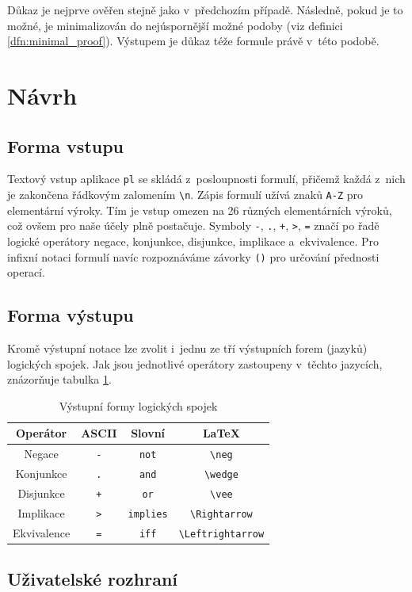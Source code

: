 \documentclass[thesis=B,czech,hidelinks]{thesis}[2012/06/26]
\begin{document}
Důkaz je nejprve ověřen stejně jako v~předchozím případě. Následně, pokud je to možné, je minimalizován do nejúspornější možné podoby (viz definici \ref{dfn:minimal_proof}). Výstupem je důkaz téže formule právě v~této podobě.

\section{Návrh}

\subsection{Forma vstupu}

Textový vstup aplikace \texttt{pl} se skládá z~posloupnosti formulí, přičemž každá z~nich je zakončena řádkovým zalomením \texttt{\textbackslash n}. Zápis formulí užívá znaků \texttt{A-Z} pro elementární výroky. Tím je vstup omezen na 26 různých elementárních výroků, což ovšem pro naše účely plně postačuje. Symboly \texttt{-}, \texttt{.}, \texttt{+}, \texttt{>}, \texttt{=} značí po řadě logické operátory negace, konjunkce, disjunkce, implikace a~ekvivalence. Pro infixní notaci formulí navíc rozpoznáváme závorky \texttt{()} pro určování přednosti operací.

\subsection{Forma výstupu}

Kromě výstupní notace lze zvolit i~jednu ze tří výstupních forem (jazyků) logických spojek. Jak jsou jednotlivé operátory zastoupeny v~těchto jazycích, znázorňuje tabulka \ref{tab:connectives_language}.

\begin{table}
\centering
\caption{Výstupní formy logických spojek}
\label{tab:connectives_language}
\begin{tabular}{|c||c|c|c|}\hline
Operátor & ASCII & Slovní & \LaTeX{} \tabularnewline \hline \hline
Negace & \verb|-| & \verb|not| & \verb|\neg| \tabularnewline \hline
Konjunkce & \verb|.| & \verb|and| & \verb|\wedge| \tabularnewline \hline
Disjunkce & \verb|+| & \verb|or| & \verb|\vee| \tabularnewline \hline
Implikace & \verb|>| & \verb|implies| & \verb|\Rightarrow| \tabularnewline \hline
Ekvivalence & \verb|=| & \verb|iff| & \verb|\Leftrightarrow| \tabularnewline \hline
\end{tabular}
\end{table}

\subsection{Uživatelské rozhraní}
\end{document}
